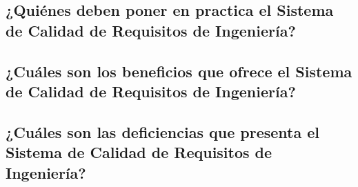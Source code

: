 \documentclass[runningheads,a4paper]{llncs}
\begin{document}
\subsection{¿Quiénes deben poner en practica el Sistema de Calidad de Requisitos de Ingeniería?}

\subsection{¿Cuáles son los beneficios que ofrece el Sistema de Calidad de Requisitos de Ingeniería?}

\subsection{¿Cuáles son las deficiencias que presenta el Sistema de Calidad de Requisitos de Ingeniería?}


\printnoidxglossaries     
         


\end{document}
